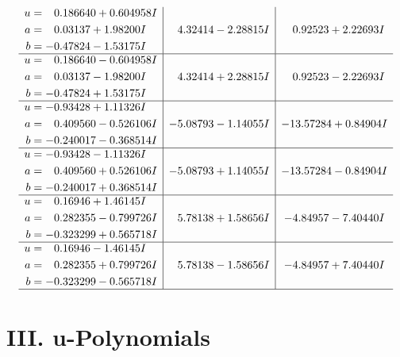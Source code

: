 \documentclass[1p]{elsarticle_modified}
\theoremstyle{definition}
\begin{document}
$$\begin{array}{c|c|c}
\begin{aligned}
u &= \phantom{-}0.186640 + 0.604958 I \\
a &= \phantom{-}0.03137 + 1.98200 I \\
b &= -0.47824 - 1.53175 I\end{aligned}
 & \phantom{-}4.32414 - 2.28815 I & \phantom{-}0.92523 + 2.22693 I \\ \hline\begin{aligned}
u &= \phantom{-}0.186640 - 0.604958 I \\
a &= \phantom{-}0.03137 - 1.98200 I \\
b &= -0.47824 + 1.53175 I\end{aligned}
 & \phantom{-}4.32414 + 2.28815 I & \phantom{-}0.92523 - 2.22693 I \\ \hline\begin{aligned}
u &= -0.93428 + 1.11326 I \\
a &= \phantom{-}0.409560 - 0.526106 I \\
b &= -0.240017 - 0.368514 I\end{aligned}
 & -5.08793 - 1.14055 I & -13.57284 + 0.84904 I \\ \hline\begin{aligned}
u &= -0.93428 - 1.11326 I \\
a &= \phantom{-}0.409560 + 0.526106 I \\
b &= -0.240017 + 0.368514 I\end{aligned}
 & -5.08793 + 1.14055 I & -13.57284 - 0.84904 I \\ \hline\begin{aligned}
u &= \phantom{-}0.16946 + 1.46145 I \\
a &= \phantom{-}0.282355 - 0.799726 I \\
b &= -0.323299 + 0.565718 I\end{aligned}
 & \phantom{-}5.78138 + 1.58656 I & -4.84957 - 7.40440 I \\ \hline\begin{aligned}
u &= \phantom{-}0.16946 - 1.46145 I \\
a &= \phantom{-}0.282355 + 0.799726 I \\
b &= -0.323299 - 0.565718 I\end{aligned}
 & \phantom{-}5.78138 - 1.58656 I & -4.84957 + 7.40440 I\\
 \hline 
 \end{array}$$\newpage
\newpage\renewcommand{\arraystretch}{1}
\centering \section*{ III. u-Polynomials}
\end{document}
